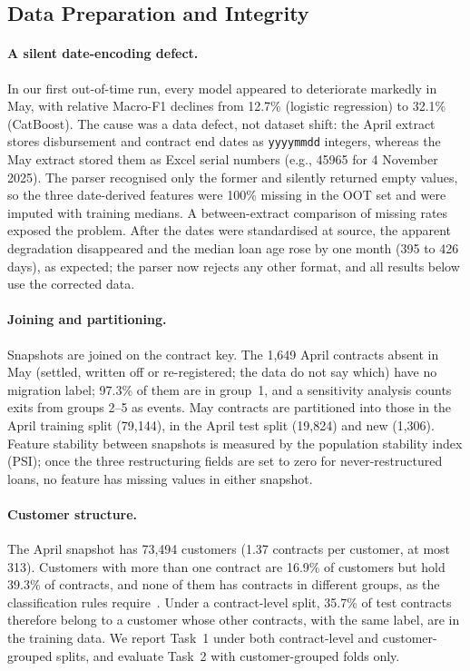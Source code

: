 \documentclass[runningheads]{llncs}
\begin{document}
\subsection{Data Preparation and Integrity}
\label{sec:prep}

\paragraph{A silent date-encoding defect.} In our first out-of-time run, every model appeared to deteriorate markedly in May, with relative Macro-F1 declines from 12.7\% (logistic regression) to 32.1\% (CatBoost). The cause was a data defect, not dataset shift: the April extract stores disbursement and contract end dates as \texttt{yyyymmdd} integers, whereas the May extract stored them as Excel serial numbers (e.g., 45965 for 4 November 2025). The parser recognised only the former and silently returned empty values, so the three date-derived features were 100\% missing in the OOT set and were imputed with training medians. A between-extract comparison of missing rates exposed the problem. After the dates were standardised at source, the apparent degradation disappeared and the median loan age rose by one month (395 to 426 days), as expected; the parser now rejects any other format, and all results below use the corrected data.

\paragraph{Joining and partitioning.} Snapshots are joined on the contract key. The 1,649 April contracts absent in May (settled, written off or re-registered; the data do not say which) have no migration label; 97.3\% of them are in group~1, and a sensitivity analysis counts exits from groups 2--5 as events. May contracts are partitioned into those in the April training split (79,144), in the April test split (19,824) and new (1,306). Feature stability between snapshots is measured by the population stability index (PSI); once the three restructuring fields are set to zero for never-restructured loans, no feature has missing values in either snapshot.

\paragraph{Customer structure.} The April snapshot has 73,494 customers (1.37 contracts per customer, at most 313). Customers with more than one contract are 16.9\% of customers but hold 39.3\% of contracts, and none of them has contracts in different groups, as the classification rules require~\cite{sbv2024tt31}. Under a contract-level split, 35.7\% of test contracts therefore belong to a customer whose other contracts, with the same label, are in the training data. We report Task~1 under both contract-level and customer-grouped splits, and evaluate Task~2 with customer-grouped folds only.
\end{document}
